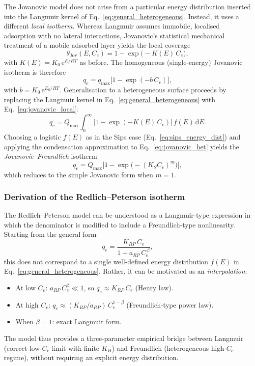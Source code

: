 	The Jovanovic model does not arise from a particular energy
	distribution inserted into the Langmuir kernel of
	Eq.~\eqref{eq:general_heterogeneous}. Instead, it uses a different
	\emph{local isotherm}. Whereas Langmuir assumes immobile, localised
	adsorption with no lateral interactions, Jovanovic's statistical
	mechanical treatment of a mobile adsorbed layer yields the local
	coverage
	\begin{equation}
		\theta_{\mathrm{Jov}}(E, C_e)
		= 1 - \exp\!\bigl(-K(E)\,C_e\bigr),
		\label{eq:jovanovic_local}
	\end{equation}
	with $K(E) = K_0\,\mathrm{e}^{E/RT}$ as before. The homogeneous
	(single-energy) Jovanovic isotherm is therefore
	\begin{equation}
		\boxed{q_e = q_{\max}\bigl[1 - \exp(-b\,C_e)\bigr],}
	\end{equation}
	with $b = K_0\,\mathrm{e}^{E_0/RT}$. Generalisation to a
	heterogeneous surface proceeds by replacing the Langmuir kernel in
	Eq.~\eqref{eq:general_heterogeneous} with
	Eq.~\eqref{eq:jovanovic_local}:
	\begin{equation}
		q_e = Q_{\max}\int_{0}^{\infty}
		\bigl[1 - \exp(-K(E)\,C_e)\bigr]\, f(E)\,\mathrm{d}E.
		\label{eq:jovanovic_het}
	\end{equation}
	Choosing a logistic $f(E)$ as in the Sips case
	(Eq.~\eqref{eq:sips_energy_dist}) and applying the condensation
	approximation to Eq.~\eqref{eq:jovanovic_het} yields the
	\emph{Jovanovic--Freundlich} isotherm
	\begin{equation}
		q_e = Q_{\max}\bigl[1 - \exp\!\bigl(-(K_S C_e)^m\bigr)\bigr],
	\end{equation}
	which reduces to the simple Jovanovic form when $m = 1$.

	\subsubsection{Derivation of the Redlich--Peterson isotherm}

	The Redlich--Peterson model can be understood as a Langmuir-type
	expression in which the denominator is modified to include a
	Freundlich-type nonlinearity. Starting from the general form
	\begin{equation}
		q_e = \frac{K_{RP}\, C_e}{1 + a_{RP}\, C_e^{\,\beta}},
	\end{equation}
	this does not correspond to a single well-defined energy
	distribution $f(E)$ in Eq.~\eqref{eq:general_heterogeneous}.
	Rather, it can be motivated as an \emph{interpolation}:
	\begin{itemize}
		\item At low $C_e$: $a_{RP}\,C_e^{\beta} \ll 1$, so
		$q_e \approx K_{RP}\,C_e$ (Henry law).
		\item At high $C_e$: $q_e \approx (K_{RP}/a_{RP})\,
		C_e^{1-\beta}$ (Freundlich-type power law).
		\item When $\beta = 1$: exact Langmuir form.
	\end{itemize}
	The model thus provides a three-parameter empirical bridge between
	Langmuir (correct low-$C_e$ limit with finite $K_H$) and Freundlich
	(heterogeneous high-$C_e$ regime), without requiring an explicit
	energy distribution.

